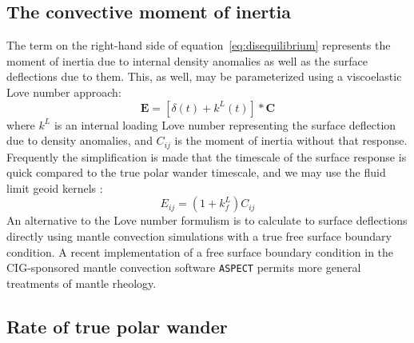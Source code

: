 \documentclass[extra,mreferee]{gji}
\begin{document}
\subsection{The convective moment of inertia}
\label{sec:convective_moment}

The term on the right-hand side of equation~\eqref{eq:disequilibrium} represents the moment of inertia due to internal density anomalies as well as the surface deflections due to them.
This, as well, may be parameterized using a viscoelastic Love number approach:
\begin{equation} 
\mathbf{E} = \left[ \delta(t) + k^L(t) \right] * \mathbf{C}
\end{equation}
where $k^L$ is an internal loading Love number representing the surface deflection due to density anomalies, and $C_{ij}$ is the moment of inertia without that response.
Frequently the simplification is made that the timescale of the surface response is quick compared to the true polar wander timescale, and we may use the fluid limit geoid kernels \citep[e.g.][]{richards1984geoid}:  
\begin{equation}
E_{ij} = (1+k^L_f) C_{ij}
\end{equation}
An alternative to the Love number formulism is to calculate to surface deflections directly using mantle convection simulations with a true free surface boundary condition.
A recent implementation of a free surface boundary condition in the CIG-sponsored mantle convection software \texttt{ASPECT} \citep{rose2015free}
permits more general treatments of mantle rheology.

\subsection{Rate of true polar wander}
\label{sec:tpw_rate}
\end{document}
